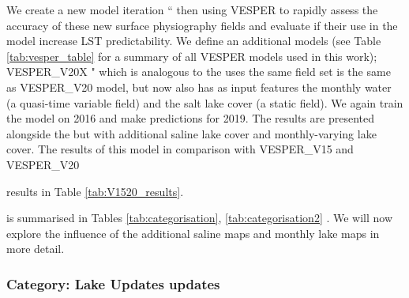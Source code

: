 \documentclass[hess, twostagejnl]{copernicus}
\providecommand{\DIFadd}[1]{{\protect\color{blue} \sf #1}} %
\providecommand{\DIFdel}[1]{{\protect\color{red} \scriptsize #1}} %
\providecommand{\DIFaddbegin}{} %
\providecommand{\DIFaddend}{} %
\providecommand{\DIFdelbegin}{} %
\providecommand{\DIFdelend}{} %
\begin{document}
\DIFdel{We create a new model iteration ``}\DIFdelend \DIFaddbegin \DIFadd{then using VESPER to rapidly assess the accuracy of these new surface physiography fields and evaluate if their use in the model increase LST predictability. We define an additional models (see Table \ref{tab:vesper_table} for a summary of all VESPER models used in this work); VESPER\_}\DIFaddend V20X \DIFdelbegin \DIFdel{" which is analogous to the }\DIFdelend \DIFaddbegin \DIFadd{uses the same field set is the same as VESPER\_}\DIFaddend V20 \DIFdelbegin \DIFdel{model, but now also has as input features the monthly water (a quasi-time variable field) and the salt lake cover (a static field). We again train the model on 2016 and make predictions for 2019. The results are presented alongside the }\DIFdelend \DIFaddbegin \DIFadd{but with additional saline lake cover and monthly-varying lake cover. The results of this model in comparison with VESPER\_V15 and VESPER\_}\DIFaddend V20 \DIFdelbegin \DIFdel{results in Table \ref{tab:V1520_results}.

}%
\DIFdelend \DIFaddbegin \DIFadd{is summarised in Tables \ref{tab:categorisation}, \ref{tab:categorisation2} . We will now explore the influence of the additional saline maps and monthly lake maps in more detail.

}\DIFaddend 

\subsubsection{Category: Lake \DIFdelbegin \DIFdel{Updates}\DIFdelend \DIFaddbegin \DIFadd{updates}\DIFaddend }\DIFdelbegin %
\end{document}
